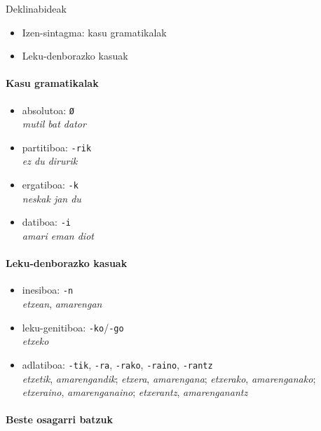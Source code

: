 \documentclass[
]{book}
\providecommand{\tightlist}{%
  \setlength{\itemsep}{0pt}\setlength{\parskip}{0pt}}
\begin{document}
Deklinabideak

\begin{itemize}
\tightlist
\item
  Izen-sintagma: kasu gramatikalak
\item
  Leku-denborazko kasuak
\end{itemize}

\hypertarget{kasu-gramatikalak}{%
\paragraph{Kasu gramatikalak}\label{kasu-gramatikalak}}

\begin{itemize}
\tightlist
\item
  absolutoa: \texttt{Ø}\\
  \emph{mutil bat dator}
\item
  partitiboa: \texttt{-rik}\\
  \emph{ez du dirurik}
\item
  ergatiboa: \texttt{-k}\\
  \emph{neskak jan du}
\item
  datiboa: \texttt{-i}\\
  \emph{amari eman diot}
\end{itemize}

\hypertarget{leku-denborazko-kasuak}{%
\paragraph{Leku-denborazko kasuak}\label{leku-denborazko-kasuak}}

\begin{itemize}
\tightlist
\item
  inesiboa: \texttt{-n}\\
  \emph{etxean}, \emph{amarengan}
\item
  leku-genitiboa: \texttt{-ko}/\texttt{-go}\\
  \emph{etxeko}
\item
  adlatiboa: \texttt{-tik}, \texttt{-ra}, \texttt{-rako}, \texttt{-raino}, \texttt{-rantz}\\
  \emph{etxetik}, \emph{amarengandik}; \emph{etxera}, \emph{amarengana}; \emph{etxerako}, \emph{amarenganako}; \emph{etxeraino}, \emph{amarenganaino}; \emph{etxerantz}, \emph{amarenganantz}
\end{itemize}

\hypertarget{beste-osagarri-batzuk}{%
\paragraph{Beste osagarri batzuk}\label{beste-osagarri-batzuk}}
\end{document}
